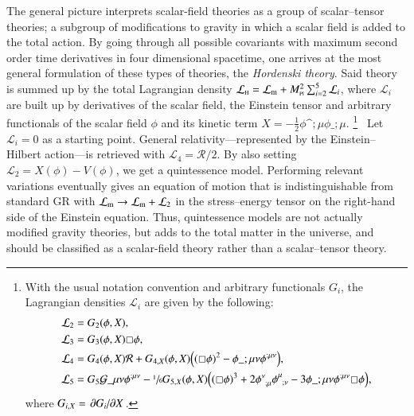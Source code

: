 









The general picture interprets scalar-field theories as a group of scalar--tensor theories; a subgroup of modifications to gravity in which a scalar field is added to the total action. By going through all possible covariants with maximum second order time derivatives in four dimensional spacetime, one arrives at the most general formulation of these types of theories, the \emph{Hordenski theory}. Said theory is summed up by the total Lagrangian density $\mathcal{L}_{\text{\tiny{H}}} = \mathcal{L}_\mathrm{m} + M_{\text{\tiny{Pl}}}^2 \sum_{i=2}^{5} \mathcal{L}_i$, where $\mathcal{L}_i$ are built up by derivatives of the scalar field, the Einstein tensor and arbitrary functionals of the scalar field $\phi$ and its kinetic term $X = - \frac{1}{2} \phi\^{;\mu}\phi\_{;\mu}$.%
\footnote{%
With the usual notation convention and arbitrary functionals $G_i$, the Lagrangian densities $\mathcal{L}_i$ are given by the following:
\begin{equation*}
    \begin{split}
        \mathcal{L}_2 &= G_2(\phi, X), \\
        \mathcal{L}_3 &= G_3 (\phi, X)\sq \phi, \\
        \mathcal{L}_4 &= G_4 (\phi, X)\mathcal{R} + G_{4,X}(\phi, X) \pclosed{ {(\sq \phi)}^2 - \phi\_{;\mu\nu} \phi\^{;\mu\nu}}, \\
        \mathcal{L}_5 &= G_5 \mathcal{G}\_{\mu\nu}\phi\^{;\mu\nu} - \sfrac{1}{6} G_{5,X}(\phi, X)  \pclosed{ {(\sq \phi)}^3 + 
        2\phi\indices{^\nu_{;\mu}}\phi\indices{^\mu_{;\nu}} - 3  \phi\_{;\mu\nu} \phi\^{;\mu\nu} \sq \phi},
    \end{split}
\end{equation*}%
where $G_{i,X}= \pdv*{G_i}{X}$.
}~%
Let $\mathcal{L}_i=0$ as a starting point. %
General relativity---represented by the Einstein--Hilbert action---is retrieved with $\mathcal{L}_4 = \mathcal{R}/2$.  By also setting $\mathcal{L}_2 = X(\phi)-V(\phi)$, we get a quintessence model. Performing relevant variations eventually gives an equation of motion that is indistinguishable from standard GR with $\mathcal{L}_\mathrm{m} \to \mathcal{L}_\mathrm{m} + \mathcal{L}_2$ in the stress--energy tensor on the right-hand side of the Einstein equation. Thus, quintessence models are not actually modified gravity theories, but adds to the total matter in the universe, and should be classified as a scalar-field theory rather than a scalar--tensor theory. %






